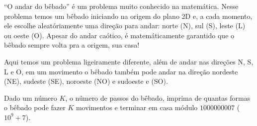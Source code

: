 %
“O andar do bêbado” é um problema muito conhecido na matemática. Nesse problema temos um bêbado iniciando na origem do plano 2D e, a cada momento, ele escolhe aleatóriamente uma direção para andar: norte (N), sul (S), leste (L) ou oeste (O). Apesar do andar caótico, é matemáticamente garantido que o bêbado sempre volta pra a origem, sua casa!

Aqui temos um problema ligeiramente diferente, além de andar nas direções N, S, L e O, em um movimento o bêbado também pode andar na direção nordeste (NE), sudeste (SE), noroeste (NO) e sudoeste e (SO). 

Dado um número $K$, o número de passos do bêbado, imprima de quantas formas o bêbado pode fazer $K$ movimentos e terminar em casa módulo $1000000007$ ($10^9 + 7$).
%
%

%
%



\sampleio
